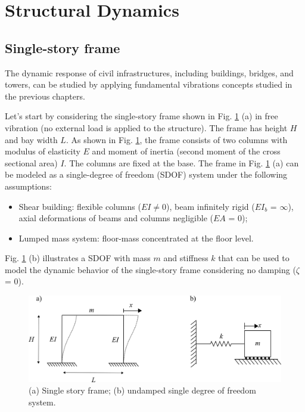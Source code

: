 \documentclass[12pt,letter]{article}
\numberwithin{ex}{section} %
\numberwithin{re}{section} %
\begin{document}
	
	
\section{ Structural Dynamics}	
	
\subsection{Single-story frame}
	\setcounter{figure}{0}   
	\renewcommand\thefigure{\thesection.\arabic{figure}}

The dynamic response of civil infrastructures, including buildings, bridges, and towers, can be studied by applying fundamental vibrations concepts studied in the previous chapters. 

Let's start by considering the single-story frame shown in Fig. \ref{fig:single_} (a) in free vibration (no external load is applied to the structure). The frame has height $H$ and bay width $L$. As shown in Fig. \ref{fig:single_}, the frame consists of two columns with modulus of elasticity $E$ and moment of inertia (second moment of the cross sectional area) $I$. The columns are fixed at the base. The frame in Fig. \ref{fig:single_} (a) can be modeled as a single-degree of freedom (SDOF) system under the following assumptions:

\begin{itemize}
	\item Shear building: flexible columns ($EI \neq 0$), beam infinitely rigid ($EI_b$ = $\infty$), axial deformations of beams and columns negligible ($EA$ = 0);
	\item Lumped mass system: floor-mass concentrated at the floor level.
\end{itemize}

Fig. \ref{fig:single_} (b) illustrates a SDOF with mass $m$ and stiffness $k$ that can be used to model the dynamic behavior of the single-story frame considering no damping ($\zeta$ = 0). 

\begin{figure}[H]
	\centering
	\includegraphics{../figures/Single_story_frame.png}
	\caption{(a) Single story frame; (b) undamped single degree of freedom system.}
	\label{fig:single_}
\end{figure}
\end{document}

